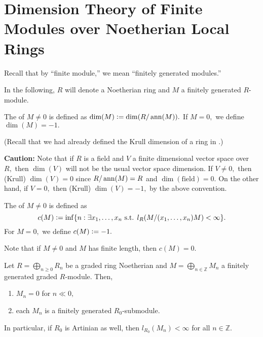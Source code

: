 \documentclass[12pt]{article}	%
\begin{document}
\section{Dimension Theory of Finite Modules over Noetherian Local Rings}
Recall that by ``finite module,'' we mean ``finitely generated modules.''

In the following, $R$ will denote a Noetherian ring and $M$ a finitely generated $R$-module.

\begin{defn}%
	The  of $M \neq 0$ is defined as $\dim(M) \vcentcolon= \dim(R/\operatorname{ann}(M)).$ If $M = 0,$ we define $\dim(M) = -1.$
\end{defn}
(Recall that we had already defined the Krull dimension of a ring in .)

\begin{disc}
	{\color{red}\textbf{Caution:}} Note that if $R$ is a field and $V$ a finite dimensional vector space over $R,$ then $\dim(V)$ will {\color{red}not} be the usual vector space dimension. If $V \neq 0,$ then (Krull) $\dim(V) = 0$ since $R/\operatorname{ann}(M) = R$ and $\dim(\text{field}) = 0.$ On the other hand, if $V = 0,$ then (Krull) $\dim(V) = -1,$ by the above convention.
\end{disc}

\begin{defn}%
	The  of $M \neq 0$ is defined as
	\begin{equation*} 
		c(M) \vcentcolon= \inf \{n : \exists x_1, \ldots, x_n \text{ s.t. } l_R(M/(x_1, \ldots, x_n)M) < \infty\}.
	\end{equation*}	
	For $M = 0,$ we define $c(M) \vcentcolon= -1.$
\end{defn}

Note that if $M \neq 0$ and $M$ has finite length, then $c(M) = 0.	$

\begin{prop}
	Let $R = \bigoplus_{n \ge 0}R_n$ be a graded ring Noetherian and $M = \bigoplus_{n \in \mathbb{Z}}M_n$ a finitely generated graded $R$-module. Then,
	\begin{enumerate}
		\item $M_n = 0$ for $n \ll 0,$
		\item each $M_n$ is a finitely generated $R_0$-submodule.
	\end{enumerate}
	In particular, if $R_0$ is Artinian as well, then $l_{R_0}(M_n) < \infty$ for all $n \in \mathbb{Z}.$
\end{prop}
\end{document}
